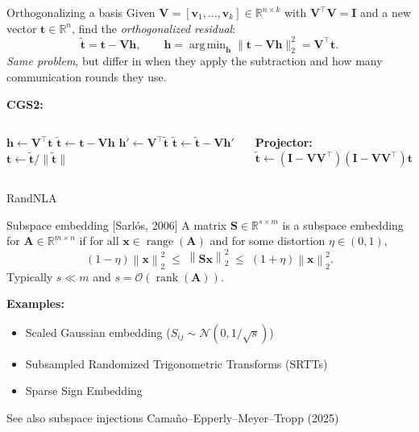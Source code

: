 \documentclass[xcolor=dvipsnames,10pt]{beamer}
\DeclareMathOperator*{\argmin}{arg\,min}
\newcommand{\bigO}{\mathcal{O}}
\newcommand{\norm}[1]{\left\lVert#1\right\rVert}
\renewcommand{\vec}[1]{\bm{#1}}
\newcommand{\mat}[1]{\bm{#1}}
\newcommand{\R}{\mathbb{R}}
\begin{document}
\begin{frame}{Orthogonalizing a basis}
Given $\mat{V}=[\vec{v}_1,\ldots,\vec{v}_k]\in\R^{n\times k}$
with $\mat{V}^\top\mat{V}=\mat{I}$ and a new vector $\vec{t}\in\R^n$, find the
\emph{orthogonalized residual}:
\[
  \tilde{\vec{t}} = \vec{t} - \mat{V}\vec{h},
  \qquad
  \vec{h} = \argmin_{\vec{h}}\|\vec{t} - \mat{V}\vec{h}\|_2^2 = \mat{V}^\top\vec{t}.
\]
\emph{Same problem}, but differ in when they
apply the subtraction and how many communication rounds they use.

\pause
\vspace{0.4em}
\textbf{CGS2:}

\begin{tcolorbox}[colback=green!5,colframe=green!50!black,
  boxrule=0.4pt,top=2pt,bottom=2pt,left=3pt,right=3pt]
\begin{columns}[T]
  
  \begin{algorithmic}[1]
    \State $\vec{h} \gets \mat{V}^\top \vec{t}$   
    \State $\tilde{\vec{t}} \gets \vec{t} - \mat{V}\vec{h}$
    \State $\vec{h}' \gets \mat{V}^\top \tilde{\vec{t}}$
    \State $\tilde{\vec{t}} \gets \tilde{\vec{t}} - \mat{V}\vec{h}'$
    \State $\vec{t} \gets \tilde{\vec{t}}/\|\tilde{\vec{t}}\|$
  \end{algorithmic}
  \vspace{1em}
  \textbf{Projector:}
  \begin{equation*}
      \vec{\tilde{t}} \gets (\mat{I}-\mat{VV}^\top)(\mat{I}-\mat{VV}^\top)\vec{t}
  \end{equation*}
\end{columns}
\end{tcolorbox}
\end{frame}



\begin{frame}{RandNLA}
\begin{block}{Subspace embedding {\footnotesize [Sarl\'os, 2006]}}
A matrix $\mat{S}\in\R^{s\times m}$ is a subspace embedding for $\mat{A}\in\R^{m\times n}$
if for all $\vec{x}\in\operatorname{range}(\mat{A})$ and for some distortion $\eta\in(0,1)$,
\begin{equation*}
  (1-\eta)\norm{\vec{x}}_2^2 \;\leq\; \norm{\mat{S}\vec{x}}_2^2
  \;\leq\; (1+\eta)\norm{\vec{x}}_2^2.
\end{equation*}
Typically $s\ll m$ and $s=\bigO(\operatorname{rank}(\mat{A}))$.
\end{block}
\pause
\textbf{Examples:}
\begin{itemize}
  \item Scaled Gaussian embedding ($S_{ij}\sim\mathcal{N}(0,1/\sqrt{s})$)
  \item Subsampled Randomized Trigonometric Transforms (SRTTs)
  \item Sparse Sign Embedding
\end{itemize}
See also subspace injections {\footnotesize Cama\~{n}o--Epperly--Meyer--Tropp (2025)}
\end{frame}
\end{document}
